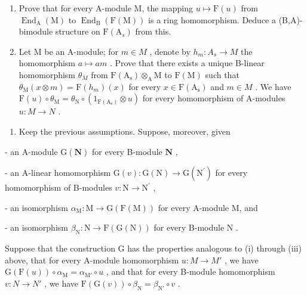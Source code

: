 \begin{enumerate}
\def\labelenumi{\alph{enumi})}
\item
  Prove that for every A-module M, the mapping \(u \mapsto \mathrm{F}(u)\) from \(\operatorname{End}_{\mathrm{A}}(\mathrm{M})\) to \(\operatorname{End}_{\mathrm{B}}(\mathrm{F}(\mathrm{M}))\) is a ring homomorphism. Deduce a (B,A)-bimodule structure on \(\mathrm{F}(\mathrm{A}_{s})\) from this.
\item
  Let M be an A-module; for \(m \in M\) , denote by \(h_{m} : A_{s} \to M\) the homomorphism \(a \mapsto am\) . Prove that there exists a unique B-linear homomorphism \(\theta_{M}\) from \(\mathrm{F(A_{s})} \otimes_{\mathrm{A}} \mathrm{M}\) to \(\mathrm{F(M)}\) such that \(\theta_{\mathrm{M}}(x \otimes m) = \mathrm{F}(h_{m})(x)\) for every \(x \in \mathrm{F(A_{s})}\) and \(m \in M\) . We have \(\mathrm{F}(u) \circ \theta_{\mathrm{M}} = \theta_{\mathrm{N}} \circ (1_{\mathrm{F(A_{s})}} \otimes u)\) for every homomorphism of A-modules \(u : M \to N\) .
\end{enumerate}

\begin{enumerate}
\def\labelenumi{\arabic{enumi})}
\setcounter{enumi}{6}
\tightlist
\item
  Keep the previous assumptions. Suppose, moreover, given
\end{enumerate}

- an A-module \(\mathrm{G}(\mathbf{N})\) for every B-module \(\mathbf{N}\) ,

- an A-linear homomorphism \(\mathrm{G}(v):\mathrm{G}(\mathrm{N})\to \mathrm{G}(\mathrm{N}^{\prime})\) for every homomorphism of B-modules \(v:\mathrm{N}\rightarrow \mathrm{N}^{\prime}\) ,

- an isomorphism \(\alpha_{\mathrm{M}}: \mathrm{M} \to \mathrm{G}(\mathrm{F}(\mathrm{M}))\) for every A-module M, and

- an isomorphism \(\beta_{\mathrm{N}}: \mathrm{N} \to \mathrm{F}(\mathrm{G}(\mathrm{N}))\) for every B-module \(\mathrm{N}\) .

Suppose that the construction G has the properties analogous to (i) through (iii) above, that for every A-module homomorphism \(u: M \to M'\) , we have \(\mathrm{G}(\mathrm{F}(u)) \circ \alpha_{\mathrm{M}} = \alpha_{\mathrm{M}'} \circ u\) , and that for every B-module homomorphism \(v: N \to N'\) , we have \(\mathrm{F}(\mathrm{G}(v)) \circ \beta_{\mathrm{N}} = \beta_{\mathrm{N}'} \circ v\) .

